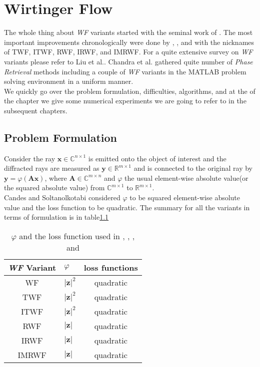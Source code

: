 \chapter{Wirtinger Flow}

The whole thing about \emph{\ac{WF}} variants started with the seminal work of \cite{Candes2014}.
The most important improvements chronologically were done by \cite{Chen2015}, \cite{Kolte2016}, and\cite{Zhang2016}
with the nicknames of \ac{TWF}, \ac{ITWF}, \ac{RWF}, \ac{IRWF}, and \ac{IMRWF}.
For a quite extensive survey on \emph{\ac{WF}} variants please refer to Liu et al.\cite{Liu2019}. Chandra et al.\cite{Chandra2017} 
gathered quite number of \emph{Phase Retrieval} methods including a couple of \emph{\ac{WF}} variants in the MATLAB\textregistered\space 
problem solving environment in a uniform manner.\\
We quickly go over the problem formulation, difficulties, algorithms, and at the of the chapter we give some numerical experiments we are going
to refer to in the subsequent chapters.

\section{Problem Formulation}
Consider the ray $\boldsymbol{x} \in \mathbb{C}^{n \times 1}$ is emitted onto the object of interest and the diffracted rays are measured as 
$\boldsymbol{y} \in \mathbb{R}^{m \times 1}$ and is connected to the original ray by $\boldsymbol{y} = \varphi(\boldsymbol{A}\boldsymbol{x})$,
where $\boldsymbol{A} \in \mathbb{C}^{m \times n}$ and $\varphi$ the usual element-wise absolute value(or the squared absolute value) from 
$\mathbb{C}^{m \times 1}$ to $\mathbb{R}^{m \times 1}$.\\
Candes and Soltanolkotabi\cite{Candes2014} considered $\varphi$ to be squared element-wise absolute value and the loss function to be quadratic. 
The summary for all the variants in terms of formulation is in table\ref{tab:formulation}  


\begin{table}
	\centering
	\begin{tabular}{||c l c||} 
	 \hline
	 \emph{\ac{WF}} Variant & $\varphi$ 						& loss functions\\ [0.5ex] 
	 \hline\hline
	 \ac{WF}\index{WF}                & $\left|\boldsymbol{z}\right|^2$ 	& quadratic 	\\
	 \ac{TWF}\index{TWF}   & $\left|\boldsymbol{z}\right|^2$ 	& quadratic 	\\
	 \ac{ITWF}\index{ITWF}  & $\left|\boldsymbol{z}\right|^2$   & quadratic 	\\
	 \ac{RWF}\index{RWF}  & $\left|\boldsymbol{z}\right|$ 	& quadratic 	\\
	 \ac{IRWF}\index{IRWF}   & $\left|\boldsymbol{z}\right|$ 	& quadratic 	\\
	 \ac{IMRWF}\index{IMRWF}   & $\left|\boldsymbol{z}\right|$ 	& quadratic 	\\ [1ex]
	 \hline
	\end{tabular}
	\caption{$\varphi$ and the loss function used in \cite{Candes2014}, \cite{Chen2015}, \cite{Kolte2016}, and \cite{Zhang2016}}
	\label{tab:formulation}
	\end{table}
